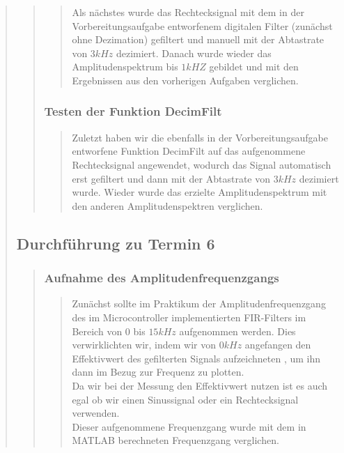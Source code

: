 \begin{quote}
\begin{quote}
\begin{quote}
			Als nächstes wurde das Rechtecksignal mit dem in der Vorbereitungsaufgabe
			entworfenem digitalen Filter (zunächst ohne Dezimation) gefiltert und manuell
			mit der Abtastrate von $3 kHz$ dezimiert. Danach wurde wieder das
			Amplitudenspektrum bis $1 kHZ$ gebildet und mit den Ergebnissen aus den
			vorherigen Aufgaben verglichen.
			
			\end{quote}%
			
			\subsubsection{Testen der Funktion DecimFilt}
			\begin{quote}
			
			Zuletzt haben wir die ebenfalls in der Vorbereitungsaufgabe entworfene
			Funktion DecimFilt auf das aufgenommene Rechtecksignal angewendet, wodurch das
			Signal automatisch erst gefiltert und dann mit der Abtastrate von $3 kHz$
			dezimiert wurde. Wieder wurde das erzielte Amplitudenspektrum mit den anderen
			Amplitudenspektren verglichen.
			
			\end{quote}%

		\end{quote}%
		
		\subsection{Durchführung zu Termin 6}
		\begin{quote}
		
			\subsubsection{Aufnahme des Amplitudenfrequenzgangs}
			\begin{quote}
			
			Zunächst sollte im Praktikum der Amplitudenfrequenzgang des im
			Microcontroller implementierten FIR-Filters im Bereich von $0$ bis $15 kHz$
			aufgenommen werden. Dies verwirklichten wir, indem wir von $0 kHz$ angefangen
			den Effektivwert des gefilterten Signals aufzeichneten , um ihn dann im Bezug
			zur Frequenz zu plotten.\\
			Da wir bei der Messung den Effektivwert nutzen ist es auch egal ob wir einen Sinussignal oder ein Rechtecksignal
			verwenden.\\
			Dieser aufgenommene Frequenzgang wurde mit dem in MATLAB berechneten
			Frequenzgang verglichen. 
			

\end{quote}
\end{quote}
\end{quote}
